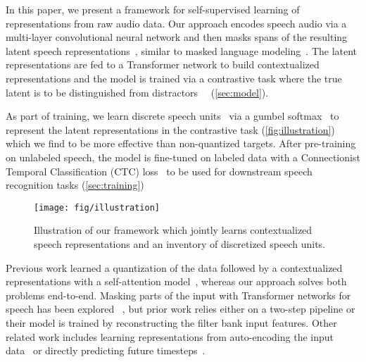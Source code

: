 \documentclass{article}
\begin{document}
In this paper, we present a framework for self-supervised learning of representations from raw audio data. 
Our approach encodes speech audio via a multi-layer convolutional neural network and then masks spans of the resulting latent speech representations~\citep{jiang2019improving,wang2020unsupervised}, similar to masked language modeling~\citep{devlin2018bert}.
The latent representations are fed to a Transformer network to build contextualized representations and the model is trained via a contrastive task where the true latent is to be distinguished from distractors~\citep{oord2018cpc,schneider2019wav2vec,rivire2020unsupervised,kawakami2020learning} ~(\autoref{sec:model}).

As part of training, we learn discrete speech units~\citep{oord2017neural,alex2019unsupervised,chorowski2019unsup,harwath2019learning} via a gumbel softmax~\citep{jang2016gumbel,baevski2019vqwav2vec} to represent the latent representations in the contrastive task (\autoref{fig:illustration}) which we find to be more effective than non-quantized targets.
After pre-training on unlabeled speech, the model is fine-tuned on labeled data with a Connectionist Temporal Classification (CTC) loss~\citep{graves2006ctc,baevski2019effectiveness} to be used for downstream speech recognition tasks (\autoref{sec:training})

\begin{figure}[t]
\centering
\texttt{[image: fig/illustration]}
\caption{Illustration of our framework which jointly learns contextualized speech representations and an inventory of discretized speech units.}
\label{fig:illustration}
\end{figure}

Previous work learned a quantization of the data followed by a contextualized representations with a self-attention model~\citep{baevski2019vqwav2vec,baevski2019effectiveness}, whereas our approach solves both problems end-to-end.
Masking parts of the input with Transformer networks for speech has been explored ~\citep{baevski2019effectiveness,jiang2019improving}, but prior work relies either on a two-step pipeline or their model is trained by reconstructing the filter bank input features.
Other related work includes learning representations from auto-encoding the input data~\citep{tjandra2019vqvae,eloff2019unsupervised} or directly predicting future timesteps~\citep{chung2019apc}.
\end{document}
